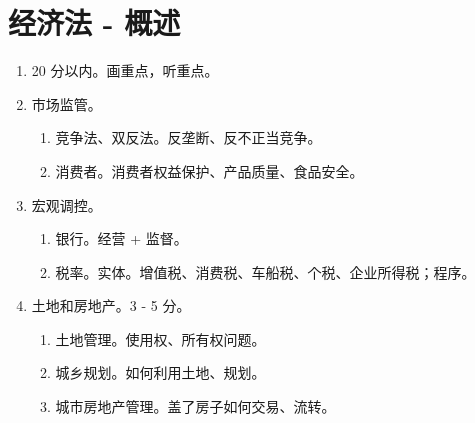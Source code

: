 \section{经济法 - 概述}
\begin{enumerate}
  \item 20 分以内。画重点，听重点。
  \item 市场监管。
        \begin{enumerate}
          \item 竞争法、双反法。反垄断、反不正当竞争。
          \item 消费者。消费者权益保护、产品质量、食品安全。
        \end{enumerate}
  \item 宏观调控。
        \begin{enumerate}
          \item 银行。经营 + 监督。
          \item 税率。实体。增值税、消费税、车船税、个税、企业所得税；程序。
        \end{enumerate}
  \item 土地和房地产。3 - 5 分。
        \begin{enumerate}
          \item 土地管理。使用权、所有权问题。
          \item 城乡规划。如何利用土地、规划。
          \item 城市房地产管理。盖了房子如何交易、流转。
        \end{enumerate}
\end{enumerate}
